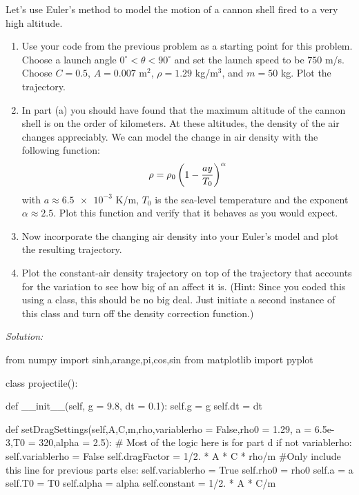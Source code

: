 \begin{enumerate}
\prob Let's use Euler's method to model the motion of a cannon shell fired
to a very high altitude.  
\begin{enumerate}
\item Use your code from the previous problem as a starting point for
  this problem.   Choose a launch angle $0^\circ < \theta <
  90^\circ$ and set the launch speed to be $750$ m/s. Choose $C= 0.5$,
  $A = 0.007$ m$^2$, $\rho = 1.29$ kg/m$^3$, and $m = 50$ kg. Plot the trajectory.
\item  In part (a) you should have found that the maximum altitude of
  the cannon shell is on the order of kilometers.  At these altitudes,
  the density of the air changes appreciably.  We can model the change
  in air density with the following function:
\begin{equation}
\rho = \rho_0 \left( 1 - {a y\over T_0} \right)^\alpha
\end{equation} 
with $a \approx \num{6.5e-3}$ K/m, $T_0$ is the sea-level temperature
and the exponent $\alpha \approx 2.5$.  Plot this function and verify
that it behaves as you would expect.
\item Now incorporate the changing air density into your Euler's model
  and plot the resulting trajectory.
\item Plot the constant-air density trajectory on top of the
  trajectory that accounts for the variation to see how big of an
  affect it is. (Hint: Since you coded this using a class, this should
  be no big deal.  Just initiate a second instance of this class and
  turn off the density correction function.)

\end{enumerate}

\ifsolutions
\textit{Solution:}\\
\begin{codeexample}
\begin{VerbatimOut}{\listingFile}
from numpy import sinh,arange,pi,cos,sin
from matplotlib import pyplot



class projectile():

    def __init__(self, g = 9.8, dt = 0.1):
        self.g = g
        self.dt = dt


    def setDragSettings(self,A,C,m,rho,variablerho = False,rho0 = 1.29, a = 6.5e-3,T0 = 320,alpha = 2.5):
        # Most of the logic here is for part d
        if not variablerho:
            self.variablerho = False
            self.dragFactor = 1/2. * A * C * rho/m  #Only include this line for previous parts
        else:
            self.variablerho = True
            self.rho0 = rho0
            self.a = a
            self.T0 = T0
            self.alpha = alpha
            self.constant = 1/2. * A * C/m



\end{VerbatimOut}
\end{codeexample}
\end{enumerate}
